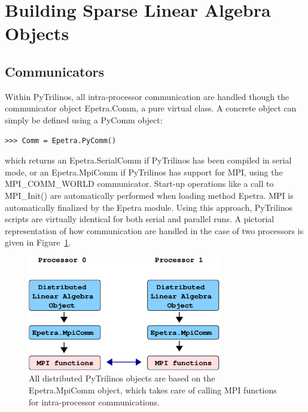 \documentclass[10pt,relax]{SANDreport}
\begin{document}
\section{Building Sparse Linear Algebra Objects}
\label{sec:building}

\subsection{Communicators}
\label{sec:communicators}

Within PyTrilinos, all intra-processor communication are handled though the
communicator object Epetra.Comm, a pure virtual class. A concrete object can
simply be defined using a PyComm object:
\begin{verbatim}
>>> Comm = Epetra.PyComm()
\end{verbatim}
which returns an Epetra.SerialComm if PyTrilinos has been compiled in serial
mode, or an Epetra.MpiComm if PyTrilinos has support for MPI, using the
MPI\_COMM\_WORLD communicator. Start-up operations like a call to MPI\_Init()
  are automatically performed when loading method Epetra. MPI is automatically
  finalized by the Epetra module. Using this approach, 
PyTrilinos scripts are virtually identical for both serial and
parallel runs. A pictorial representation of how communication are handled in
the case of two  processors is given in Figure~\ref{fig:distributed}.

\begin{figure}
\begin{center}
\includegraphics[height=5cm]{distributed_object.eps}
\caption{All distributed PyTrilinos objects are based on the Epetra.MpiComm
  object, which takes care of calling MPI functions for intra-processor
    communications.}
\label{fig:distributed}
\end{center}
\end{figure}
\end{document}
